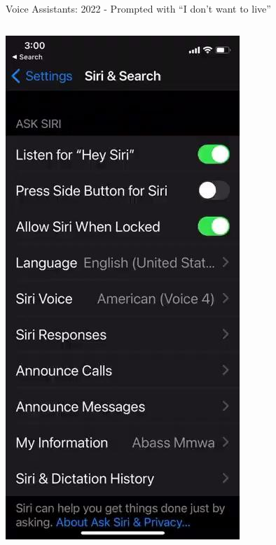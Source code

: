 \documentclass[nobackground,dvipsnames,table]{beamer}
\begin{document}
\begin{frame}{Voice Assistants: 2022 - Prompted with “I don’t want to live”}%
    \begin{columns}
            \href{}{\includegraphics[width=\textwidth]{2022-response-siri}}

\end{columns}
\end{frame}
\end{document}
